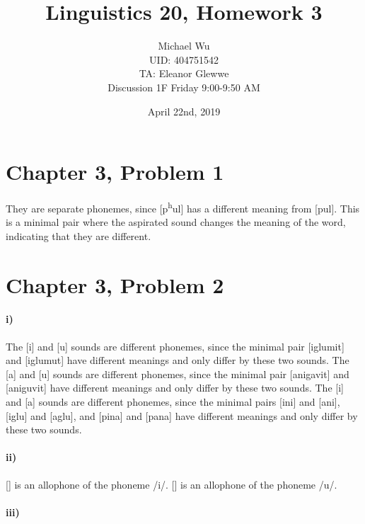 \documentclass[12pt]{article}
\begin{document}
\title{Linguistics 20, Homework 3}
\date{April 22nd, 2019}
\author{Michael Wu\\UID: 404751542\\TA: Eleanor Glewwe\\Discussion 1F Friday 9:00-9:50 AM}
\maketitle

\section*{Chapter 3, Problem 1}

They are separate phonemes, since [p\textsuperscript{h}ul] has a different meaning from [pul]. This is a minimal pair
where the aspirated sound changes the meaning of the word, indicating that they are different.

\section*{Chapter 3, Problem 2}

\paragraph{i)}

The [i] and [u] sounds are different phonemes, since the minimal pair [iglumit] and [iglumut] have different meanings
and only differ by these two sounds. The [a] and [u] sounds are different phonemes, since the minimal pair [anigavit]
and [aniguvit] have different meanings and only differ by these two sounds. The [i] and [a] sounds are different phonemes,
since the minimal pairs [ini] and [ani], [iglu] and [aglu], and [pin\textlengthmark a] and [pan\textlengthmark a] have
different meanings and only differ by these two sounds.

\paragraph{ii)}

[\textsci] is an allophone of the phoneme /i/. [\textupsilon] is an allophone of the phoneme /u/.

\pagebreak

\paragraph{iii)}
\end{document}
